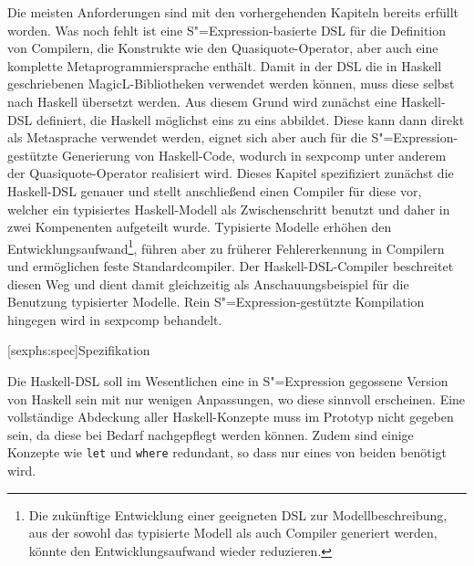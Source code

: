 \documentclass[12pt, a4paper, bibgerm]{scrbook}
\newcommand\icode[1]{\lstinline?#1?}
\newcommand\lsection{}
\newcommand\cref{}
\newcommand{\sexp}{S"=Expression}
\begin{document}
Die meisten Anforderungen sind mit den vorhergehenden Kapiteln bereits
erfüllt worden. Was noch fehlt ist eine \sexp{}-basierte DSL für die
Definition von Compilern, die Konstrukte wie den Quasiquote-Operator,
aber auch eine komplette Metaprogrammiersprache enthält. Damit in der
DSL die in Haskell geschriebenen MagicL-Bibliotheken verwendet werden
können, muss diese selbst nach Haskell übersetzt werden. Aus diesem
Grund wird zunächst eine Haskell-DSL definiert, die Haskell möglichst
eins zu eins abbildet. Diese kann dann direkt als Metasprache verwendet
werden, eignet sich aber auch für die \sexp{}-gestützte Generierung von
Haskell-Code, wodurch in \cref{sexpcomp} unter anderem der
Quasiquote-Operator realisiert wird. Dieses Kapitel spezifiziert
zunächst die Haskell-DSL genauer und stellt anschließend einen Compiler
für diese vor, welcher ein typisiertes Haskell-Modell als Zwischenschritt benutzt und
daher in zwei Kompenenten aufgeteilt wurde. Typisierte Modelle erhöhen
den Entwicklungsaufwand\footnote{Die zukünftige Entwicklung einer
  geeigneten DSL zur Modellbeschreibung, aus der sowohl das typisierte
  Modell als auch Compiler generiert werden, könnte den
  Entwicklungsaufwand wieder reduzieren.}, führen aber zu früherer
Fehlererkennung in Compilern und ermöglichen feste Standardcompiler. Der
Haskell-DSL-Compiler beschreitet diesen Weg und dient damit gleichzeitig
als Anschauungsbeispiel für die Benutzung typisierter Modelle. Rein
\sexp{}-gestützte Kompilation hingegen wird in \cref{sexpcomp}
behandelt.

\lsection[sexphs:spec]{Spezifikation}

Die Haskell-DSL soll im Wesentlichen eine in \sexp{} gegossene Version
von Haskell sein mit nur wenigen Anpassungen, wo diese sinnvoll
erscheinen. Eine vollständige Abdeckung aller Haskell-Konzepte muss im
Prototyp nicht gegeben sein, da diese bei Bedarf nachgepflegt werden
können. Zudem sind einige Konzepte wie \icode{let} und \icode{where}
redundant, so dass nur eines von beiden benötigt wird. 
\end{document}
